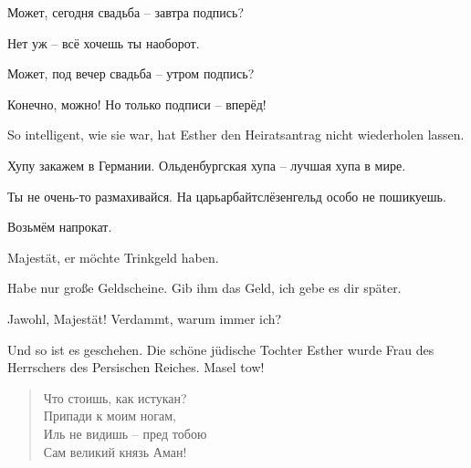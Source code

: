 \documentclass[12pt,a4paper,titlepage]{article}
\begin{document}
\begin{drama}
Может, сегодня свадьба -- завтра подпись?

Нет уж -- всё хочешь ты наоборот.

Может, под вечер свадьба -- утром подпись­­?

Конечно, можно! Но только подписи -- вперёд!

\vspace{3ex}

\uespeaks
So intelligent, wie sie war, hat Esther den Heiratsantrag nicht wiederholen lassen.

\vspace{3ex}

\espeaks
Хупу закажем в Германии. Ольденбургская хупа -- лучшая хупа в мире.

\ahspeaks
Ты не очень-то размахивайся. На царьарбайтслёзенгельд особо не пошикуешь.

\espeaks
Возьмём напрокат.

\scene


\uespeaks
Majestät, er möchte Trinkgeld haben.

\ahspeaks
Habe nur große Geldscheine. Gib ihm das Geld, ich gebe es dir später.

\uespeaks
Jawohl, Majestät!  Verdammt, warum immer ich?



\uespeaks
Und so ist es geschehen. Die schöne jüdische Tochter Esther
wurde Frau des Herrschers des Persischen Reiches. Masel tow!


\scene


\amspeaks {}
\begin{verse}
Что стоишь, как истукан?\\
Припади к моим ногам,\\
Иль не видишь -- пред тобою\\
Сам великий князь Аман!\\
\end{verse}


\end{drama}
\end{document}
